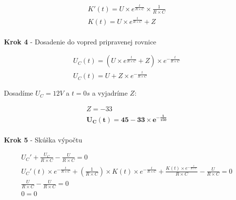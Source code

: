 \begin{gather*}
K'(t) = U \times e^{\frac{t}{R \times C}} \times \frac{1}{R \times C}\\
K(t) = U \times e^{\frac{t}{R \times C}} + Z\\
\end{gather*}


\begin{center}
\textbf{Krok 4} - Dosadenie do vopred pripravenej rovnice
\end{center}

\begin{gather*}
U_{C}(t) =(U \times e^{\frac{t}{R \times C}} + Z) \times e^{-\frac{t}{R \times C}}\\
U_{C}(t) =U + Z \times e^{-\frac{t}{R \times C}}
\end{gather*}

\begin{center}
Dosadíme $U_{C} = 12V$ a $t = 0s$ a vyjadríme $Z$:
\end{center}

\begin{gather*}
Z = -33\\
\boldsymbol{U_{C}(t) = 45 - 33 \times e^{-\frac{t}{150}}}\\
\end{gather*}

\begin{center}
\textbf{Krok 5} - Skúška výpočtu
\end{center}

\begin{gather*}
U_{C}' + \frac{U_{C}}{R \times C} -  \frac{U}{R \times C} = 0\\
U_{C}'(t) \times e^{-\frac{t}{R \times C}} + ( \frac{1}{R \times C}) \times K(t) \times e^{-\frac{t}{R \times C}} + \frac{K(t) \times e^{-\frac{t}{R \times C}}}{R \times C} - \frac{U}{R \times C} = 0\\
\frac{U}{R \times C} - \frac{U}{R \times C} = 0\\
0 = 0
\end{gather*}
